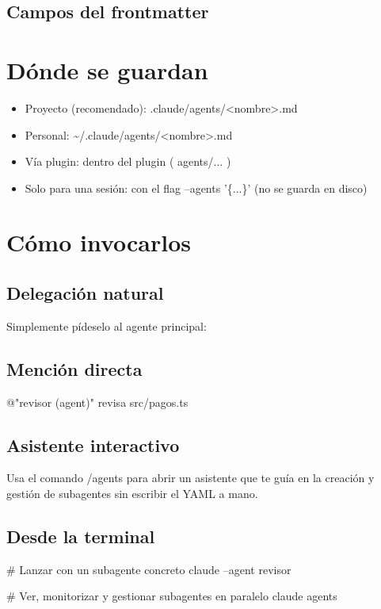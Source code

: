 \documentclass[11pt,a4paper]{book}
\begin{document}
\subsection{Campos del frontmatter}
\section{Dónde se guardan}
\begin{itemize}\item Proyecto (recomendado): .claude/agents/<nombre>.md\end{itemize}
\begin{itemize}\item Personal: \textasciitilde{}/.claude/agents/<nombre>.md\end{itemize}
\begin{itemize}\item Vía plugin: dentro del plugin ( agents/... )\end{itemize}
\begin{itemize}\item Solo para una sesión: con el flag --agents '\{...\}' (no se guarda en disco)\end{itemize}
\section{Cómo invocarlos}
\subsection{Delegación natural}
Simplemente pídeselo al agente principal:

\subsection{Mención directa}
\begin{codebox}
@"revisor (agent)" revisa src/pagos.ts
\end{codebox}
\subsection{Asistente interactivo}
Usa el comando /agents para abrir un asistente que te guía en la creación y gestión de subagentes sin escribir el YAML a mano.

\subsection{Desde la terminal}
\begin{codebox}
# Lanzar con un subagente concreto
claude --agent revisor

# Ver, monitorizar y gestionar subagentes en paralelo
claude agents
\end{codebox}
\end{document}
